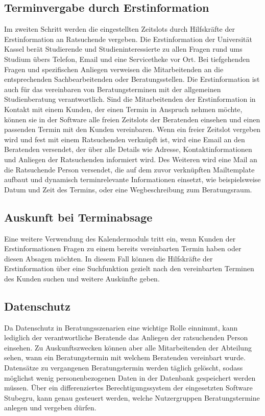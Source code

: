\subsection{Terminvergabe durch Erstinformation}
Im zweiten Schritt werden die eingestellten Zeitslots durch Hilfskräfte der
Erstinformation an Ratsuchende vergeben. Die Erstinformation der Universität
Kassel berät Studierende und Studieninteressierte zu allen Fragen rund ums
Studium übers Telefon, Email und eine Servicetheke vor Ort. Bei tiefgehenden
Fragen und spezifischen Anliegen verweisen die Mitarbeitenden an die
entsprechenden Sachbearbeitenden oder Beratungsstellen. Die Erstinformation ist
auch für das vereinbaren von Beratungsterminen mit der allgemeinen
Studienberatung verantwortlich. Sind die Mitarbeitenden der Erstinformation in
Kontakt mit einem Kunden, der einen Termin in Anspruch nehmen möchte, können
sie in der Software alle freien Zeitslots der Beratenden einsehen und einen
passenden Termin mit den Kunden vereinbaren. Wenn ein freier Zeitslot vergeben
wird und fest mit einem Ratsuchenden verknüpft ist, wird eine Email an den
Beratenden versendet, der über alle Details wie Adresse, Kontaktinformationen
und Anliegen der Ratsuchenden informiert wird. Des Weiteren wird eine Mail an
die Ratsuchende Person versendet, die auf dem zuvor verknüpften Mailtemplate
aufbaut und dynamisch terminrelevante Informationen einsetzt, wie
beispielsweise Datum und Zeit des Termins, oder eine Wegbeschreibung zum
Beratungsraum.

\subsection{Auskunft bei Terminabsage}
Eine weitere Verwendung des Kalendermoduls tritt ein, wenn Kunden der
Erstinformationen Fragen zu einem bereits vereinbarten Termin haben oder diesen
Absagen möchten. In diesem Fall können die Hilfskräfte der Erstinformation über
eine Suchfunktion gezielt nach den vereinbarten Terminen des Kunden suchen und
weitere Auskünfte geben.

\subsection{Datenschutz}
Da Datenschutz in Beratungsszenarien eine wichtige Rolle einnimmt, kann
lediglich der verantwortliche Beratende das Anliegen der ratsuchenden Person
einsehen. Zu Auskunftszwecken können aber alle Mitarbeitenden der Abteilung
sehen, wann ein Beratungstermin mit welchem Beratenden vereinbart wurde.
Datensätze zu vergangenen Beratungstermin werden täglich gelöscht, sodass
möglichst wenig personenbezogenen Daten in der Datenbank gespeichert werden
müssen. Über ein differenziertes Berechtigungssystem der eingesetzten Software
Stubegru, kann genau gesteuert werden, welche Nutzergruppen Beratungstermine
anlegen und vergeben dürfen.

